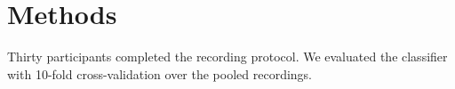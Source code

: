 \documentclass{article}
\begin{document}
\section{Methods}
Thirty participants completed the recording protocol.
We evaluated the classifier with 10-fold cross-validation over the pooled recordings.
\end{document}
